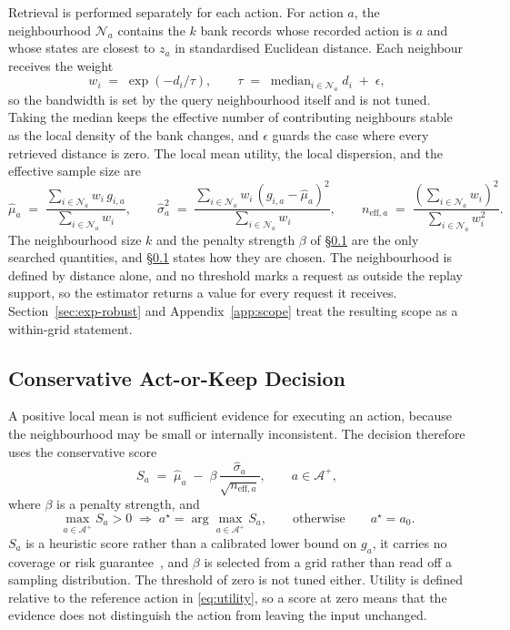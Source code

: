 \documentclass{article}
\newcommand{\calA}{\mathcal{A}}
\newcommand{\calN}{\mathcal{N}}
\begin{document}
Retrieval is performed separately for each action. For action $a$, the neighbourhood
$\calN_a$ contains the $k$ bank records whose recorded action is $a$ and whose states are
closest to $z_a$ in standardised Euclidean distance. Each neighbour receives the weight
\begin{equation}
  w_i \;=\; \exp\!\left(-d_i / \tau\right),
  \qquad
  \tau \;=\; \operatorname{median}_{i \in \calN_a} d_i \;+\; \epsilon ,
  \label{eq:weights}
\end{equation}
so the bandwidth is set by the query neighbourhood itself and is not tuned. Taking the median
keeps the effective number of contributing neighbours stable as the local density of the bank
changes, and $\epsilon$ guards the case where every retrieved distance is zero. The local mean
utility, the local dispersion, and the effective sample size are
\begin{equation}
  \hat\mu_a \;=\; \frac{\sum_{i \in \calN_a} w_i\, g_{i,a}}{\sum_{i \in \calN_a} w_i},
  \qquad
  \hat\sigma_a^{2} \;=\; \frac{\sum_{i \in \calN_a} w_i\, (g_{i,a} - \hat\mu_a)^{2}}{\sum_{i \in \calN_a} w_i},
  \qquad
  n_{\mathrm{eff},a} \;=\; \frac{\left(\sum_{i \in \calN_a} w_i\right)^{2}}{\sum_{i \in \calN_a} w_i^{2}} .
  \label{eq:local-moments}
\end{equation}
The neighbourhood size $k$ and the penalty strength $\beta$ of \S\ref{sec:method-decision} are
the only searched quantities, and \S\ref{sec:method-decision} states how they are chosen. The
neighbourhood is defined by distance alone, and no threshold marks a request as outside the
replay support, so the estimator returns a value for every request it receives.
Section~\ref{sec:exp-robust} and Appendix~\ref{app:scope} treat the resulting scope as a
within-grid statement.

\subsection{Conservative Act-or-Keep Decision}
\label{sec:method-decision}
A positive local mean is not sufficient evidence for executing an action, because the
neighbourhood may be small or internally inconsistent. The decision therefore uses the
conservative score
\begin{equation}
  S_a \;=\; \hat\mu_a \;-\; \beta\, \frac{\hat\sigma_a}{\sqrt{n_{\mathrm{eff},a}}},
  \qquad a \in \calA^{+},
  \label{eq:score}
\end{equation}
where $\beta$ is a penalty strength, and
\begin{equation}
  \max_{a \in \calA^{+}} S_a > 0
  \;\Rightarrow\;
  a^{\star} = \arg\max_{a \in \calA^{+}} S_a ,
  \qquad\text{otherwise}\qquad
  a^{\star} = a_0 .
  \label{eq:decision}
\end{equation}
$S_a$ is a heuristic score rather than a calibrated lower bound on $g_a$, it carries no
coverage or risk guarantee~\citep{angelopoulos2024conformal}, and $\beta$ is selected from a
grid rather than read off a sampling distribution. The threshold of zero is not tuned either.
Utility is defined relative to the reference action in \eqref{eq:utility}, so a score at zero
means that the evidence does not distinguish the action from leaving the input unchanged.
\end{document}

